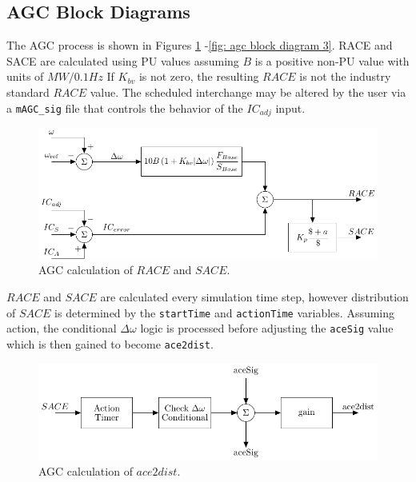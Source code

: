 \subsection{AGC Block Diagrams}
The AGC process is shown in Figures \ref{fig: agc block diagram 1} -\ref{fig: agc block diagram 3}.
RACE and SACE are calculated using PU values assuming $B$ is a positive non-PU value with units of $MW/0.1Hz$
If $K_{bv}$ is not zero, the resulting $RACE$ is not the industry standard $RACE$ value.
The scheduled interchange may be altered by the user via a \verb|mAGC_sig| file that controls the behavior of the $IC_{adj}$ input.


\begin{figure}[!h]
	\centering
	\footnotesize
	\includegraphics[width=\linewidth]{sections/agc/200722-AGCblockdiagram-p1}
	\caption{AGC calculation of $RACE$ and $SACE$.}
	\label{fig: agc block diagram 1}
\end{figure}%

\pagebreak
$RACE$ and $SACE$ are calculated every simulation time step, however
distribution of $SACE$ is determined by the \verb|startTime| and \verb|actionTime| variables.
Assuming action, the conditional $\Delta\omega$ logic is processed before adjusting the \verb|aceSig| value which is then gained to become \verb|ace2dist|.

\begin{figure}[!h]
	\centering
	\footnotesize
	\includegraphics[width=\linewidth]{sections/agc/200722-AGCblockdiagram-p2}
	\caption{AGC calculation of $ace2dist$.}
	\label{fig: agc block diagram 2}
\end{figure}%

